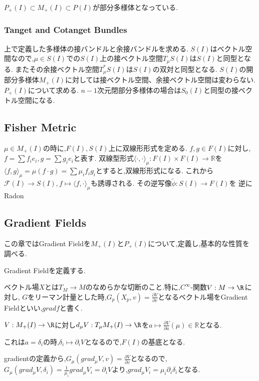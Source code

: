 \documentclass[dvipdfmx]{ujarticle}
\begin{document}
$P_+(I) \subset M_{+}(I) \subset P(I)$が部分多様体となっている.

\subsubsection{Tanget and Cotanget Bundles}
上で定義した多様体の接バンドルと余接バンドルを求める.
$S(I)$はベクトル空間なので,$\mu \in S(I)$での$S(I)$上の接ベクトル空間$T_{\mu}S(I)$は$S(I)$と同型となる.
またその余接ベクトル空間$T_{\mu}^*S(I)$は$S(I)$の双対と同型となる.
$S(I)$の開部分多様体$M_{+}(I)$に対しては接ベクトル空間、余接ベクトル空間は変わらない.
$P_+(I)$について求める.
$n-1$次元閉部分多様体の場合は$S_0(I)$と同型の接ベクトル空間になる.

\subsection{Fisher Metric}
$\mu \in M_{+}(I)$の時に,$F(I),S(I)$上に双線形形式を定める.
$f,g \in F(I)$に対し,$f= \sum f_ie_i, g= \sum g_ie_i $と表す.
双線型形式$\langle\cdot, \cdot \rangle_{\mu}: F(I) \times F(I) \to \mathbb{R}$を$\langle f, g \rangle_{\mu} = \mu(f \cdot g) = \sum \mu_i f_i g_i$とすると,双線形形式になる.
これから$\mathcal{F}(I) \to S(I), f \mapsto \langle f, \cdot \rangle_{\mu}$も誘導される.
その逆写像$\tilde{\phi}: S(I) \to F(I)$を
逆にRadon

\subsection{Gradient Fields}
この章ではGradient Fieldを$M_+(I)$と$P_+(I)$について,定義し,基本的な性質を調べる.

Gradient Fieldを定義する.
\begin{screen}
\begin{dfn}
ベクトル場$X$とは$T_M \to M$のなめらかな切断のこと.特に,$C^{\infty}$-関数$V: M \to \R$に対し,
$G$をリーマン計量とした時,$G_p(X_p, v) = \frac{\partial V}{\partial v}$となるベクトル場をGradient Fieldといい,$grad f$と書く.
\end{dfn}
\end{screen}

$V: M_+(I) \to \R$に対し$d_{\mu}V: T_{\mu}M_+(I) \to \R$を$a \mapsto \frac{\partial V}{\partial a}(\mu) \in \mathbb{R}$となる.

これは$a = \delta_i$の時,$\delta_i \mapsto \partial_i V$となるので,$F(I)$の基底となる.

gradientの定義から,$G_{\mu}(grad_{\mu}V, v) = \frac{\partial V}{\partial v}$となるので,
$G_{\mu}(grad_{\mu}V, \delta_i) = \frac{1}{\mu_i} grad_{\mu}V_i = \partial_i V$より,$grad_{\mu}V_i = \mu_i \partial_i \delta_i$となる.
\end{document}
